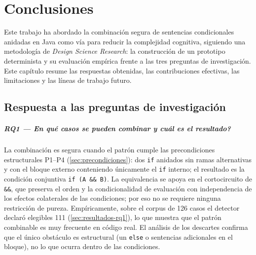 \chapter{Conclusiones}
\label{cap:conclusiones}

Este trabajo ha abordado la combinación segura de sentencias condicionales
anidadas en Java como vía para reducir la complejidad cognitiva, siguiendo una
metodología de \emph{Design Science Research}: la construcción de un prototipo
determinista y su evaluación empírica frente a las tres preguntas de
investigación. Este capítulo resume las respuestas obtenidas, las
contribuciones efectivas, las limitaciones y las líneas de trabajo futuro.

\section{Respuesta a las preguntas de investigación}

\paragraph{RQ1 — \textquestiondown{}En qué casos se pueden combinar y cuál es el resultado?}
La combinación es segura cuando el patrón cumple las precondiciones
estructurales P1--P4 (\autoref{sec:precondiciones}): dos \lstinline|if| anidados
sin ramas alternativas y con el bloque externo conteniendo únicamente el
\lstinline|if| interno; el resultado es la condición conjuntiva
\lstinline|if (A && B)|. La equivalencia se apoya en el cortocircuito de
\lstinline|&&|, que preserva el orden y la condicionalidad de evaluación con
independencia de los efectos colaterales de las condiciones; por eso no se
requiere ninguna restricción de pureza. Empíricamente, sobre el corpus de 126
casos el detector declaró elegibles 111 (\autoref{sec:resultados-rq1}), lo que
muestra que el patrón combinable es muy frecuente en código real. El análisis de
los descartes confirma que el único obstáculo es estructural (un \lstinline|else|
o sentencias adicionales en el bloque), no lo que ocurra dentro de las
condiciones.

